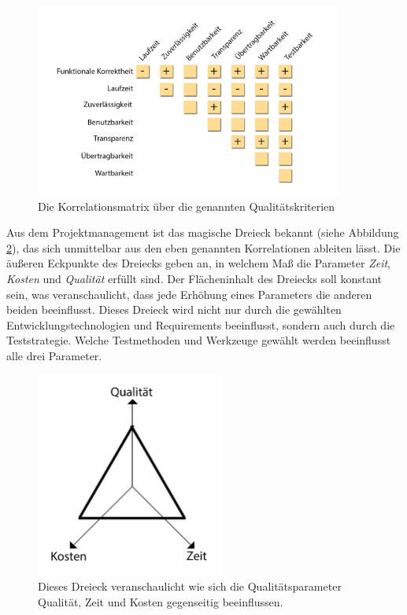 \begin{figure}[h] 
  \centering
     \includegraphics[width=0.9\textwidth]{figures/korrelationsmatrix.png}
  \caption{Die Korrelationsmatrix über die genannten Qualitätskriterien \cite{hoffmann_software-qualitat_2013}}
  \label{fig:korrelationsmatrix}
\end{figure}

Aus dem Projektmanagement ist das magische Dreieck \cite{sapper_kriterien_2007} bekannt (siehe Abbildung \ref{fig:magic_triangle}), das sich unmittelbar aus den eben genannten Korrelationen ableiten lässt. Die äußeren Eckpunkte des Dreiecks geben an, in welchem Maß die Parameter \textit{Zeit}, \textit{Kosten} und \textit{Qualität} erfüllt sind. Der Flächeninhalt des Dreiecks soll konstant sein, was veranschaulicht, dass jede Erhöhung eines Parameters die anderen beiden beeinflusst. Dieses Dreieck wird nicht nur durch die gewählten Entwicklungstechnologien und Requirements beeinflusst, sondern auch durch die Teststrategie. Welche Testmethoden und Werkzeuge gewählt werden beeinflusst alle drei Parameter.

\begin{figure}[h] 
  \centering
     \includegraphics[width=0.55\textwidth]{figures/magic_triangle.png}
  \caption{Dieses Dreieck veranschaulicht wie sich die Qualitätsparameter Qualität, Zeit und Kosten gegenseitig beeinflussen.}
  \label{fig:magic_triangle}
\end{figure}



